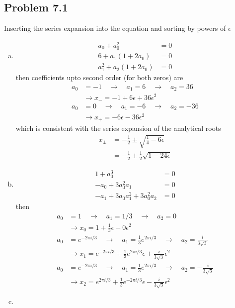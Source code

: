 \documentclass[10pt,a4paper]{book}
\theoremstyle{definition}
\begin{document}
\subsection{Problem 7.1}
Inserting the series expansion into the equation and sorting by powers of $\epsilon$
\begin{enumerate}[(a)]
\item 
\begin{align}
a_0+a_0^2&=0\\
6+a_1(1+2a_0)&=0\\
a_1^2+a_2(1+2a_0)&=0
\end{align}
then coefficients upto second order (for both zeros) are
\begin{align}
a_0&=-1\quad\rightarrow\quad a_1=6\quad\rightarrow\quad a_2=36\\
&\rightarrow x_{-}=-1+6\epsilon+36\epsilon^2\\
a_0&=0\quad\rightarrow\quad a_1=-6\quad\rightarrow\quad a_2=-36\\
&\rightarrow x_{+}=-6\epsilon-36\epsilon^2
\end{align}
which is consistent with the series expansion of the analytical roots
\begin{align}
x_{\pm}
&=-\frac{1}{2}\pm\sqrt{\frac{1}{4}-6\epsilon}\\
&=-\frac{1}{2}\pm\frac{1}{2}\sqrt{1-24\epsilon}
\end{align}

\item 
\begin{align}
1 + a_0^3&=0\\
-a_0 + 3a_0^2 a_1&=0\\
-a_1 + 3a_0 a_1^2 + 3 a_0^2 a_2&=0
\end{align}
then
\begin{align}
a_0&=1\quad\rightarrow\quad a_1=1/3\quad\rightarrow\quad a_2=0\\
&\rightarrow x_0=1+\frac{1}{3}\epsilon+0\epsilon^2\\
%
a_0&=e^{-2\pi i/3}\quad\rightarrow\quad a_1=\frac{1}{3}e^{2\pi i/3}\quad\rightarrow\quad a_2=\frac{i}{3\sqrt{3}}\\
&\rightarrow x_1
=e^{-2\pi i/3}+\frac{1}{3}e^{2\pi i/3}\epsilon+\frac{i}{3\sqrt{3}}\epsilon^2\\
%
a_0&=e^{-2\pi i/3}\quad\rightarrow\quad a_1=\frac{1}{3}e^{2\pi i/3}\quad\rightarrow\quad a_2=-\frac{i}{3\sqrt{3}}\\
&\rightarrow x_2
=e^{2\pi i/3}+\frac{1}{3}e^{-2\pi i/3}\epsilon-\frac{i}{3\sqrt{3}}\epsilon^2
\end{align}
\item
\end{enumerate}
\end{document}
